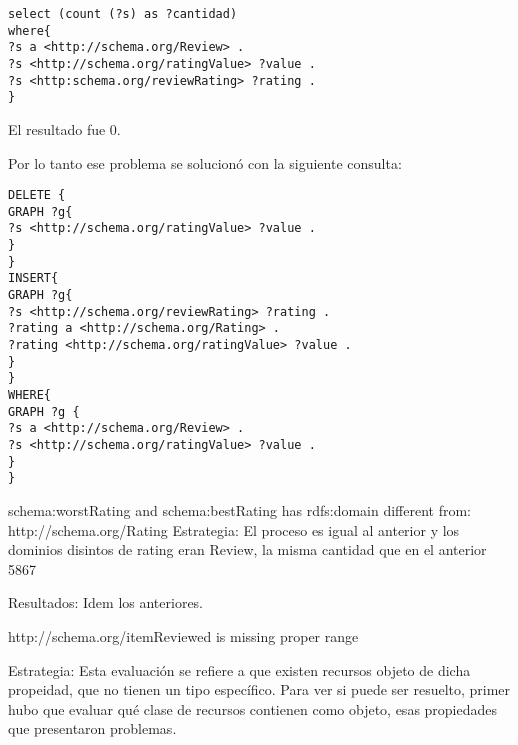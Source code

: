 \begin{lstlisting}[frame=single]  
select (count (?s) as ?cantidad) 
where{
?s a <http://schema.org/Review> . 
?s <http://schema.org/ratingValue> ?value . 
?s <http:schema.org/reviewRating> ?rating . 
}
\end{lstlisting}

El resultado fue 0.

Por lo tanto ese problema se solucionó con la siguiente consulta:

\begin{lstlisting}[frame=single]  
DELETE { 
GRAPH ?g{ 
?s <http://schema.org/ratingValue> ?value . 
} 
} 
INSERT{ 
GRAPH ?g{ 
?s <http://schema.org/reviewRating> ?rating . 
?rating a <http://schema.org/Rating> . 
?rating <http://schema.org/ratingValue> ?value . 
}
}
WHERE{
GRAPH ?g {
?s a <http://schema.org/Review> .
?s <http://schema.org/ratingValue> ?value .
}
}
\end{lstlisting}

schema:worstRating and schema:bestRating has rdfs:domain different from: http://schema.org/Rating
Estrategia:
El proceso es igual al anterior y los dominios disintos de rating eran Review, la misma cantidad que en el anterior 5867

Resultados: 
Idem los anteriores.

http://schema.org/itemReviewed is missing proper range

Estrategia:
Esta evaluación se refiere a que existen recursos objeto de dicha propeidad, que no tienen un tipo específico. Para ver si 
puede ser resuelto, primer hubo que evaluar qué clase de recursos contienen como objeto, esas propiedades que presentaron problemas.

